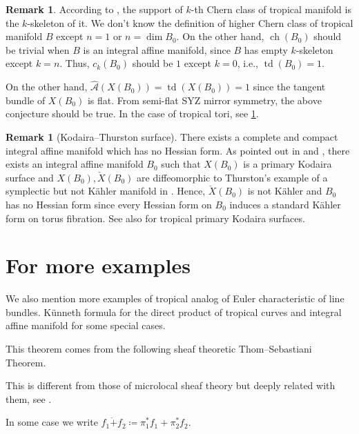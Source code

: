 \documentclass[a4paper,dvipdfmx,reqno,12pt]{amsart}
\theoremstyle{definition}
\newtheorem{Rmk}[Thm]{Remark}
\newcommand{\deq}{\coloneqq}
\newcommand{\mcal}[1]{\mathcal{#1}}%
\newcommand{\opn}[1]{\operatorname{#1}}
\numberwithin{equation}{section}
\begin{document}
\begin{Rmk}

According to \cite[5.3]{mikhalkinTropicalGeometryIts2006},
the support of $k$-th Chern class of tropical manifold is 
the $k$-skeleton of it.
We don't know the definition of higher Chern class of tropical manifold $B$ except
$n=1$ or $n=\dim B_0$. 
On the other hand, $\opn{ch}(B_0)$ should be trivial when $B$ is
an integral affine manifold, since $B$ has empty
$k$-skeleton except $k=n$.
Thus, $c_{k}(B_0)$ should be $1$ except $k=0$, 
i.e., $\opn{td}(B_0)=1$. 

On the other hand, $\hat{\mcal{A}}(X(B_0))=\opn{td}(X(B_0))=1$
since the tangent bundle of $X(B_0)$ is flat.
    From semi-flat SYZ mirror symmetry, the above conjecture should be true. In the case of tropical tori, see \ref{}.
\end{Rmk}

\begin{Rmk}[{Kodaira--Thurston surface}]
There exists a complete and compact integral affine manifold
  which has no Hessian form.
As pointed out in \cite[Example 1.14]{grossMirrorSymmetryLogarithmic2006a}
and \cite[p.403]{MR1461965}, there exists an integral affine manifold
$B_0$ such that
$X(B_0)$ is a primary Kodaira surface and $X(B_0),\check{X}(B_0)$
are diffeomorphic to Thurston's example of a symplectic but
not K\"ahler manifold in \cite{MR402764}.
Hence, $\check{X}(B_0)$ is not K\"ahler and $B_0$ has no
Hessian form since every Hessian form on $B_0$ induces a 
standard K\"ahler form
on torus fibration.
See also \cite{MR1422337} for tropical primary Kodaira surfaces.
\end{Rmk}

\section{For more examples}
We also mention more examples of 
tropical analog of Euler characteristic of 
line bundles.
 K\"unneth formula for
the direct product of tropical curves and 
integral affine manifold for some special cases.

This theorem comes from the following sheaf 
theoretic Thom--Sebastiani Theorem.



This is different from those of microlocal sheaf theory \cite[Definition 4.2.2, Definition 4.3.1]{MR1299726} but deeply related with them,
see \cite[Remark 1.1.1]{MR2031639}.



In some case we write $f_1\dot{+} f_2\deq \pi_1^{*}f_1+\pi_2^{*}f_2$.
\end{document}
